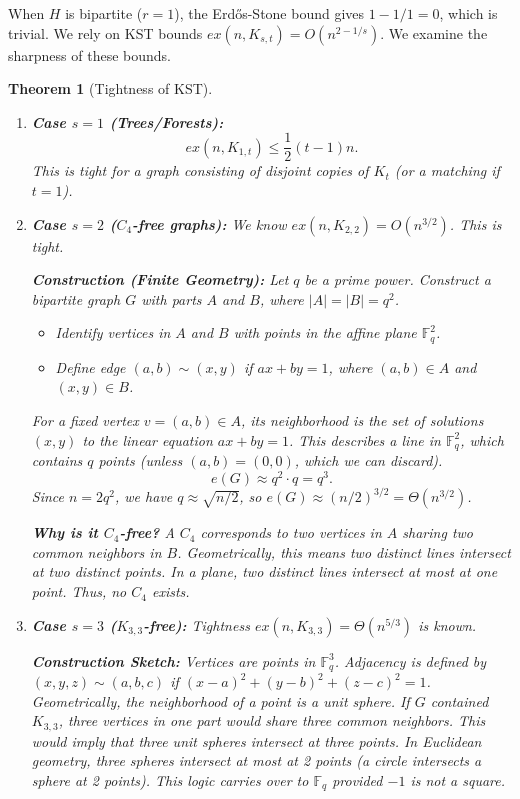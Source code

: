 \documentclass[a4paper]{article}
\newtheorem{thm}{Theorem}[section]
\begin{document}
When $H$ is bipartite ($r=1$), the Erd\H{o}s-Stone bound gives $1 - 1/1 = 0$, which is trivial. We rely on KST bounds $ex(n, K_{s,t}) = O(n^{2 - 1/s})$. We examine the sharpness of these bounds.

\begin{thm}[Tightness of KST]
    \hfill
    \begin{enumerate}
        \item \textbf{Case $s=1$ (Trees/Forests):} 
        \[ ex(n, K_{1,t}) \leq \frac{1}{2}(t-1)n. \]
        This is tight for a graph consisting of disjoint copies of $K_t$ (or a matching if $t=1$).
        
        \item \textbf{Case $s=2$ ($C_4$-free graphs):}
        We know $ex(n, K_{2,2}) = O(n^{3/2})$. This is tight.
        
        \textbf{Construction (Finite Geometry):} Let $q$ be a prime power. Construct a bipartite graph $G$ with parts $A$ and $B$, where $|A|=|B|=q^2$.
        \begin{itemize}
            \item Identify vertices in $A$ and $B$ with points in the affine plane $\mathbb{F}_q^2$.
            \item Define edge $(a,b) \sim (x,y)$ if $ax + by = 1$, where $(a,b) \in A$ and $(x,y) \in B$.
        \end{itemize}
        For a fixed vertex $v=(a,b) \in A$, its neighborhood is the set of solutions $(x,y)$ to the linear equation $ax+by=1$. This describes a line in $\mathbb{F}_q^2$, which contains $q$ points (unless $(a,b)=(0,0)$, which we can discard).
        \[
        e(G) \approx q^2 \cdot q = q^3.
        \]
        Since $n = 2q^2$, we have $q \approx \sqrt{n/2}$, so $e(G) \approx (n/2)^{3/2} = \Theta(n^{3/2})$.
        
        \textbf{Why is it $C_4$-free?} A $C_4$ corresponds to two vertices in $A$ sharing two common neighbors in $B$. Geometrically, this means two distinct lines intersect at two distinct points. In a plane, two distinct lines intersect at most at one point. Thus, no $C_4$ exists.
        
        \item \textbf{Case $s=3$ ($K_{3,3}$-free):}
        Tightness $ex(n, K_{3,3}) = \Theta(n^{5/3})$ is known.
        
        \textbf{Construction Sketch:} Vertices are points in $\mathbb{F}_q^3$. Adjacency is defined by $(x,y,z) \sim (a,b,c)$ if $(x-a)^2 + (y-b)^2 + (z-c)^2 = 1$.
        Geometrically, the neighborhood of a point is a unit sphere. If $G$ contained $K_{3,3}$, three vertices in one part would share three common neighbors. This would imply that three unit spheres intersect at three points. In Euclidean geometry, three spheres intersect at most at 2 points (a circle intersects a sphere at 2 points). This logic carries over to $\mathbb{F}_q$ provided $-1$ is not a square.
        

\end{enumerate}
\end{thm}
\end{document}
